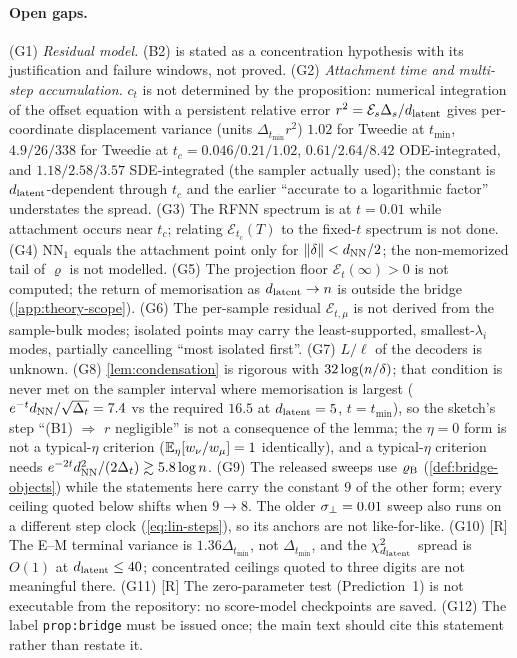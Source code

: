 \paragraph{Open gaps.}
(G1) \emph{Residual model.} (B2) is stated as a concentration hypothesis with its justification and failure windows, not proved. (G2) \emph{Attachment time and multi-step accumulation.} $c_t$ is not determined by the proposition: numerical integration of the offset equation with a persistent relative error $r^2=\mathcal E_s\Delta_s/d_{\mathrm{latent}}$ gives per-coordinate displacement variance (units $\Delta_{t_{\min}}r^2$) $1.02$ for Tweedie at $t_{\min}$, $4.9/26/338$ for Tweedie at $t_c=0.046/0.21/1.02$, $0.61/2.64/8.42$ ODE-integrated, and $1.18/2.58/3.57$ SDE-integrated (the sampler actually used); the constant is $d_{\mathrm{latent}}$-dependent through $t_c$ and the earlier ``accurate to a logarithmic factor'' understates the spread. (G3) The RFNN spectrum is at $t=0.01$ while attachment occurs near $t_c$; relating $\mathcal E_{t_c}(T)$ to the fixed-$t$ spectrum is not done. (G4) $\mathrm{NN}_1$ equals the attachment point only for $\|\delta\|<d_{\rm NN}/2$; the non-memorized tail of $\varrho$ is not modelled. (G5) The projection floor $\mathcal E_t(\infty)>0$ is not computed; the return of memorisation as $d_{\mathrm{latent}}\to n$ is outside the bridge (\cref{app:theory-scope}). (G6) The per-sample residual $\mathcal E_{t,\mu}$ is not derived from the sample-bulk modes; isolated points may carry the least-supported, smallest-$\lambda_i$ modes, partially cancelling ``most isolated first''. (G7) $L/\ell$ of the decoders is unknown. (G8) \cref{lem:condensation} is rigorous with $32\log(n/\delta)$; that condition is never met on the sampler interval where memorisation is largest ($e^{-t}d_{\rm NN}/\sqrt{\Delta_t}=7.4$ vs the required $16.5$ at $d_{\mathrm{latent}}=5$, $t=t_{\min}$), so the sketch's step ``(B1) $\Rightarrow$ $r$ negligible'' is not a consequence of the lemma; the $\eta=0$ form is not a typical-$\eta$ criterion ($\mathbb{E}_\eta[w_\nu/w_\mu]=1$ identically), and a typical-$\eta$ criterion needs $e^{-2t}d_{\rm NN}^2/(2\Delta_t)\gtrsim5.8\log n$. (G9) The released sweeps use $\varrho_{\rm B}$ (\cref{def:bridge-objects}) while the statements here carry the constant $9$ of the other form; every ceiling quoted below shifts when $9\to8$. The older $\sigma_{\perp}=0.01$ sweep also runs on a different step clock (\eqref{eq:lin-steps}), so its anchors are not like-for-like. (G10) [R] The E--M terminal variance is $1.36\Delta_{t_{\min}}$, not $\Delta_{t_{\min}}$, and the $\chi^2_{d_{\mathrm{latent}}}$ spread is $O(1)$ at $d_{\mathrm{latent}}\le40$; concentrated ceilings quoted to three digits are not meaningful there. (G11) [R] The zero-parameter test (Prediction~1) is not executable from the repository: no score-model checkpoints are saved. (G12) The label \texttt{prop:bridge} must be issued once; the main text should cite this statement rather than restate it.

